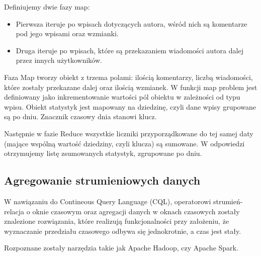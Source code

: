 

Definiujemy dwie fazy map:

\begin{itemize}[noitemsep]
  \item Pierwsza iteruje po wpisach dotyczących autora, wśród nich są komentarze pod jego wpisami oraz wzmianki.
  \item Druga iteruje po wpisach, które są przekazaniem wiadomości autora dalej przez innych użytkowników.
\end{itemize}

Faza Map tworzy obiekt z trzema polami: ilością komentarzy, liczbą wiadomości, które zostały przekazane dalej oraz ilością wzmianek. W funkcji map problem jest definiowany jako inkrementowanie wartości pól obiektu w zależności od typu wpisu. Obiekt statystyk jest mapowany na dziedzinę, czyli dane wpisy grupowane są po dniu. Znacznik czasowy dnia stanowi klucz.

Następnie w fazie Reduce wszystkie liczniki przyporządkowane do tej samej daty (mające wspólną wartość dziedziny, czyli klucza) są sumowane. W odpowiedzi otrzymujemy listę zsumowanych statystyk, zgrupowane po dniu.

\subsection{Agregowanie strumieniowych danych}

W nawiązaniu do Contineous Query Language (CQL)\cite{stream-query-gorawski}, operatorowi strumień-relacja o oknie czasowym \cite{stream-query-stanford-stochmialek}\cite{stream-processing-streamsql} oraz agregacji danych w oknach czasowych zostały znalezione rozwiązania, które realizują funkcjonalności przy założeniu, że wyznaczanie przedziału czasowego odbywa się jednokrotnie, a czas jest stały.

Rozpoznane zostały narzędzia takie jak Apache Hadoop, czy Apache Spark.
